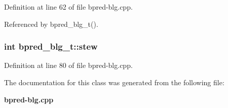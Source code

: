 Definition at line 62 of file bpred-blg.cpp.

Referenced by bpred\_\-blg\_\-t().
\subsubsection[{stew}]{\setlength{\rightskip}{0pt plus 5cm}int {\bf bpred\_\-blg\_\-t::stew}\hspace{0.3cm}{\tt  [protected]}}\label{classbpred__blg__t_76c71258ebf2357e2aaa98d5a9d7574f}




Definition at line 80 of file bpred-blg.cpp.

The documentation for this class was generated from the following file:\begin{CompactItemize}
\item 
{\bf bpred-blg.cpp}\end{CompactItemize}
